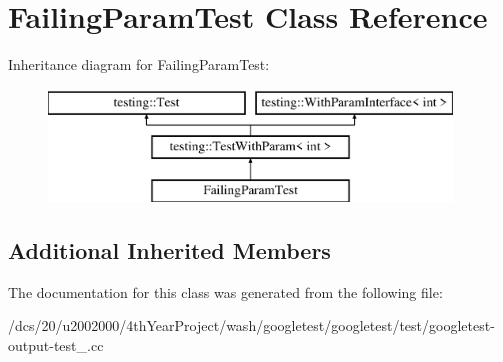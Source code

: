 \hypertarget{classFailingParamTest}{}\section{Failing\+Param\+Test Class Reference}
\label{classFailingParamTest}
Inheritance diagram for Failing\+Param\+Test\+:\begin{figure}[H]
\begin{center}
\leavevmode
\includegraphics[height=3.000000cm]{classFailingParamTest}
\end{center}
\end{figure}
\subsection*{Additional Inherited Members}


The documentation for this class was generated from the following file\+:\begin{DoxyCompactItemize}
\item 
/dcs/20/u2002000/4th\+Year\+Project/wash/googletest/googletest/test/googletest-\/output-\/test\+\_\+.\+cc\end{DoxyCompactItemize}

